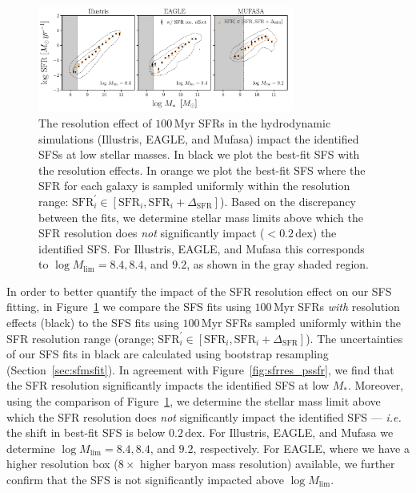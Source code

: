 \documentclass[tighten, preprint]{aastex62}
\begin{document}
\begin{figure}
\begin{center}
\includegraphics[width=0.75\textwidth]{Mlim_res_impact.pdf} 
\caption{The resolution effect of $100\,\mathrm{Myr}$ SFRs in the hydrodynamic 
simulations (Illustris, EAGLE, and {\sc Mufasa}) impact the identified SFSs 
at low stellar masses. In black we plot the best-fit SFS 
with the resolution effects. In orange we plot the best-fit SFS where 
the SFR for each galaxy is sampled uniformly within the resolution range: 
$\mathrm{SFR}_i^{\prime} \in [\mathrm{SFR}_i, \mathrm{SFR}_i +
\Delta_\mathrm{SFR}]$). Based on the discrepancy between the fits, we determine 
stellar mass limits above which the SFR resolution does {\em not} 
significantly impact ($< 0.2\,\mathrm{dex}$) the identified SFS. For Illustris, 
EAGLE, and {\sc Mufasa} this corresponds to $\log M_\mathrm{lim} = 8.4, 8.4$, 
and $9.2$, as shown in the gray shaded region.} 
\label{fig:mlim_res}
\end{center}
\end{figure}
In order to better quantify the impact of the SFR resolution effect
on our SFS fitting, in Figure~\ref{fig:mlim_res} we compare the SFS fits 
using $100\,\mathrm{Myr}$ SFRs \emph{with} resolution effects (black) to 
the SFS fits using $100\,\mathrm{Myr}$ SFRs sampled uniformly within the 
SFR resolution range (orange; 
$\mathrm{SFR}_i^{\prime} \in [\mathrm{SFR}_i, \mathrm{SFR}_i + \Delta_\mathrm{SFR}]$). 
The uncertainties of our SFS fits in black are calculated using bootstrap 
resampling (Section~\ref{sec:sfmsfit}). In agreement with 
Figure~\ref{fig:sfrres_pssfr}, we find that the SFR resolution 
significantly impacts the identified SFS at low $M_*$. Moreover, using the 
comparison of Figure~\ref{fig:mlim_res}, we determine the stellar mass 
limit above which the SFR resolution does {\em not} significantly impact 
the identified SFS --- \emph{i.e.} the shift in best-fit SFS is below 
$0.2\,\mathrm{dex}$. For Illustris, EAGLE, and {\sc Mufasa} we determine 
$\log M_\mathrm{lim} = 8.4, 8.4$, and  $9.2$, respectively. For EAGLE, 
where we have a higher resolution box ($8\times$ higher baryon mass 
resolution) available, we further confirm that the SFS is not significantly 
impacted above $\log M_\mathrm{lim}$.
\end{document}
